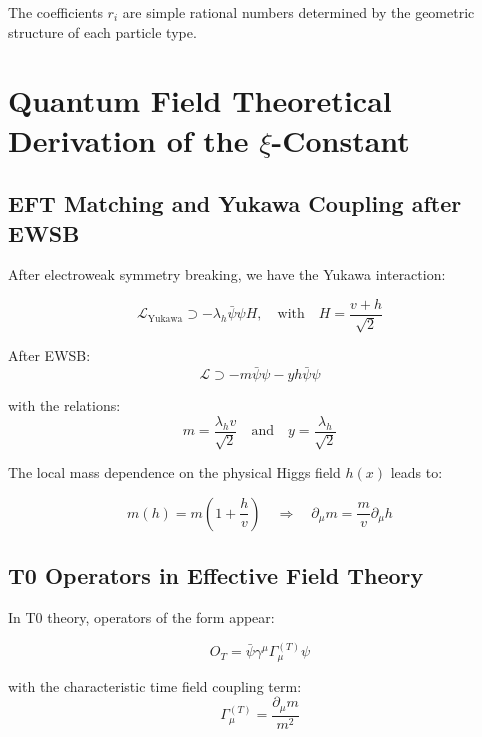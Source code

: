 	The coefficients $r_i$ are simple rational numbers determined by the geometric structure of each particle type.
	
	\section{Quantum Field Theoretical Derivation of the $\xi$-Constant}
	\label{sec:qft_derivation}
	
	\subsection{EFT Matching and Yukawa Coupling after EWSB}
	\label{subsec:eft_matching}
	
	After electroweak symmetry breaking, we have the Yukawa interaction:
	
	\begin{equation}
		\mathcal{L}_{\text{Yukawa}} \supset -\lambda_h \bar{\psi}\psi H, \quad \text{with} \quad H = \frac{v + h}{\sqrt{2}}
	\end{equation}
	
	After EWSB:
	\begin{equation}
		\mathcal{L} \supset -m \bar{\psi}\psi - y h \bar{\psi}\psi
	\end{equation}
	
	with the relations:
	\begin{equation}
		m = \frac{\lambda_h v}{\sqrt{2}} \quad \text{and} \quad y = \frac{\lambda_h}{\sqrt{2}}
	\end{equation}
	
	The local mass dependence on the physical Higgs field $h(x)$ leads to:
	
	\begin{equation}
		m(h) = m\left(1 + \frac{h}{v}\right) \quad \Rightarrow \quad \partial_\mu m = \frac{m}{v}\partial_\mu h
	\end{equation}
	
	\subsection{T0 Operators in Effective Field Theory}
	\label{subsec:t0_operators}
	
	In T0 theory, operators of the form appear:
	
	\begin{equation}
		O_T = \bar{\psi}\gamma^\mu\Gamma_\mu^{(T)}\psi
	\end{equation}
	
	with the characteristic time field coupling term:
	\begin{equation}
		\Gamma_\mu^{(T)} = \frac{\partial_\mu m}{m^2}
	\end{equation}
	
